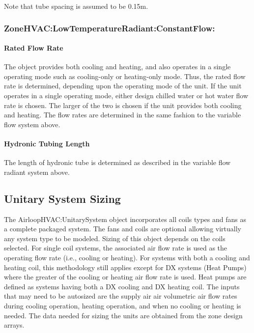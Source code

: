 Note that tube spacing is assumed to be 0.15m.

\subsubsection{ZoneHVAC:LowTemperatureRadiant:ConstantFlow:}\label{zonehvaclowtemperatureradiantconstantflow}

\paragraph{Rated Flow Rate}\label{rated-flow-rate}

The object provides both cooling and heating, and also operates in a single operating mode such as cooling-only or heating-only mode. Thus, the rated flow rate is determined, depending upon the operating mode of the unit. If the unit operates in a single operating mode, either design chilled water or hot water flow rate is chosen. The larger of the two is chosen if the unit provides both cooling and heating. The flow rates are determined in the same fashion to the variable flow system above.

\paragraph{Hydronic Tubing Length}\label{hydronic-tubing-length-1}

The length of hydronic tube is determined as described in the variable flow radiant system above.

\subsection{Unitary System Sizing}\label{unitary-system-sizing}

The AirloopHVAC:UnitarySystem object incorporates all coils types and fans as a complete packaged system. The fans and coils are optional allowing virtually any system type to be modeled. Sizing of this object depends on the coils selected. For single coil systems, the associated air flow rate is used as the operating flow rate (i.e., cooling or heating). For systems with both a cooling and heating coil, this methodology still applies except for DX systems (Heat Pumps) where the greater of the cooling or heating air flow rate is used. Heat pumps are defined as systems having both a DX cooling and DX heating coil. The inputs that may need to be autosized are the supply air air volumetric air flow rates during cooling operation, heating operation, and when no cooling or heating is needed. The data needed for sizing the units are obtained from the zone design arrays.


